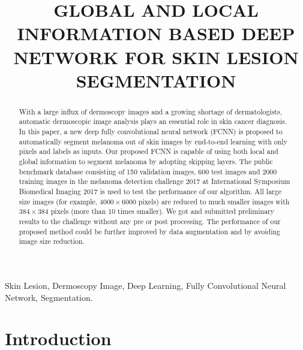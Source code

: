 \documentclass{article}
\title{GLOBAL AND LOCAL INFORMATION BASED DEEP NETWORK FOR SKIN LESION SEGMENTATION}
\begin{document}
%
\maketitle
%
\begin{abstract}
With a large influx of dermoscopy images and a growing shortage of dermatologists, automatic dermoscopic image analysis plays an essential role in skin cancer diagnosis. In this paper, a new deep fully convolutional neural network (FCNN) is proposed to automatically segment melanoma out of skin images by end-to-end learning with only pixels and labels as inputs. Our proposed FCNN is capable of using both local and global information to segment melanoma by adopting skipping layers. The public benchmark database consisting of 150 validation images, 600 test images and 2000 training images in the melanoma detection challenge 2017 at International Symposium Biomedical Imaging 2017 is used to test the performance of our algorithm. All large size images (for example, $4000\times 6000$ pixels)  are reduced to much smaller images with $384\times 384$ pixels (more than 10 times smaller).  We got and submitted preliminary results to the challenge without any pre or post processing.  The performance of our proposed method could be further improved by data augmentation and by avoiding image size reduction.

\end{abstract}
%
\begin{keywords}
Skin Lesion, Dermoscopy Image, Deep Learning, Fully Convolutional Neural Network, Segmentation.
\end{keywords}
%
\section{Introduction}
\label{sec:intro}
\end{document}
